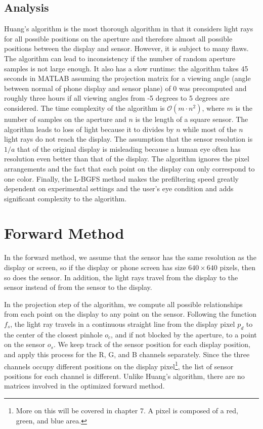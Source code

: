 \subsection{Analysis}
Huang's algorithm is the most thorough algorithm in that it considers light rays for all possible positions on the aperture and therefore almost all possible positions between the display and sensor. However, it is subject to many flaws. The algorithm can lead to inconsistency if the number of random aperture samples is not large enough. It also has a slow runtime: the algorithm takes 45 seconds in MATLAB assuming the projection matrix for a viewing angle (angle between normal of phone display and sensor plane) of 0 was precomputed and roughly three hours if all viewing angles from -5 degrees to 5 degrees are considered. The time complexity of the algorithm is $\mathcal{O}(m \cdot n^2)$, where $m$ is the number of samples on the aperture and $n$ is the length of a square sensor. The algorithm leads to loss of light because it to divides by $n$ while most of the $n$ light rays do not reach the display. The assumption that the sensor resolution is $1/a$ that of the original display is misleading because a human eye often has resolution even better than that of the display. The algorithm ignores the pixel arrangements and the fact that each point on the display can only correspond to one color. Finally, the L-BGFS method makes the prefiltering speed greatly dependent on experimental settings and the user's eye condition and adds significant complexity to the algorithm.

\section{Forward Method}

In the forward method, we assume that the sensor has the same resolution as the display or screen, so if the display or phone screen has size $640 \times 640$ pixels, then so does the sensor. In addition, the light rays travel from the display to the sensor instead of from the sensor to the display.

In the projection step of the algorithm, we compute all possible relationships from each point on the display to any point on the sensor. Following the function $f_s$, the light ray travels in a continuous straight line from the display pixel $p_d$ to the center of the closest pinhole $o_c$, and if not blocked by the aperture, to a point on the sensor $o_s$. We keep track of the sensor position for each display position, and apply this process for the R, G, and B channels separately. Since the three channels occupy different positions on the display pixel\footnote{More on this will be covered in chapter 7. A pixel is composed of a red, green, and blue area.}, the list of sensor positions for each channel is different. Unlike Huang's algorithm, there are no matrices involved in the optimized forward method.

